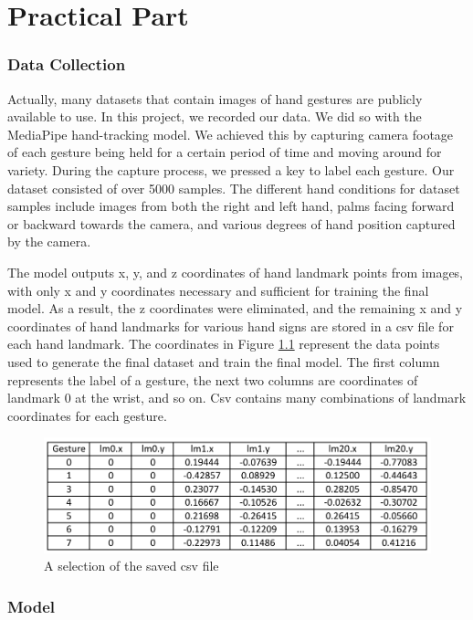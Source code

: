 \chapter{Practical Part}
\subsection{Data Collection}
Actually, many datasets that contain images of hand gestures are publicly available to use. In this project, we recorded our data. We did so with the MediaPipe hand-tracking model. We achieved this by capturing camera footage of each gesture being held for a certain period of time and moving around for variety. During the capture process, we pressed a key to label each gesture. Our dataset consisted of over 5000 samples. The different hand conditions for dataset samples include images from both the right and left hand, palms facing forward or backward towards the camera, and various degrees of hand position captured by the camera.

 The model outputs x, y, and z coordinates of hand landmark points from images, with only x and y coordinates necessary and sufficient for training the final model. As a result, the z coordinates were eliminated, and the remaining x and y coordinates of hand landmarks for various hand signs are stored in a csv file for each hand landmark.  The coordinates in Figure \ref{fig:saved_csv} represent the data points used to generate the final dataset and train the final model. The first column represents the label of a gesture, the next two columns are coordinates of landmark 0 at the wrist, and so on. Csv contains many combinations of landmark coordinates for each gesture.


\begin{figure}
	\centering
	\includegraphics[width = \textwidth]{images/gesture_laandmarks-cropped.pdf}
	\caption{A selection of the saved csv file}
	\label{fig:saved_csv}
\end{figure}


\subsection{Model}


